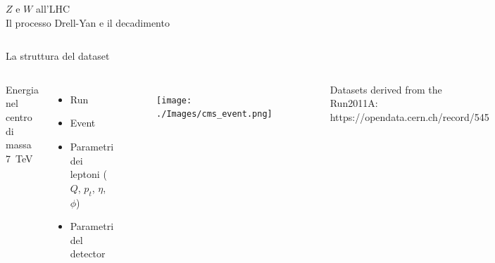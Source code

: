 \documentclass{beamer}
\begin{document}
\begin{frame}{$Z$ e $W$ all'LHC\\ Il processo Drell-Yan e il decadimento}
\begin{columns}[T]
  \end{columns}
\end{frame}

\begin{frame}{La struttura del dataset}
  \begin{columns}[T]
      \vspace*{4ex}
      \begin{block}{}
        \centering
        Energia nel centro di massa\linebreak
        \SI{7}{\tera\electronvolt}
        \vspace*{.3ex}
      \end{block}
      \vspace*{1ex}
      \begin{itemize}
        \item Run 
        \item Event
        \item Parametri dei leptoni ($Q$, $p_t$, $\eta$, $\phi$)
        \item Parametri del detector
      \end{itemize}

      \vspace*{4ex}
      \begin{figure}
        \centering
        \texttt{[image: ./Images/cms\_event.png]}
      \end{figure}
  \begin{flushright}
    \vspace{-3ex}
  \end{flushright}
  \vspace*{.7ex}
  \begin{center}
    \scriptsize
    Datasets derived from the Run2011A:\\
    https://opendata.cern.ch/record/545
  \end{center}
  \vspace*{1.5ex}
  \end{columns}
\end{frame}
\end{document}
